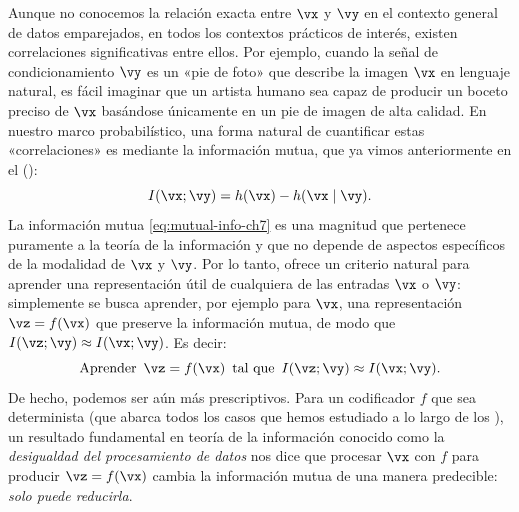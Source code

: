 \documentclass[../../book-main_es.tex]{subfiles}
\begin{document}
Aunque no conocemos la relación exacta entre $\vx$ y $\vy$ en el
contexto general de datos emparejados, en todos los contextos prácticos de interés,
existen correlaciones significativas entre ellos. Por ejemplo, cuando la señal de condicionamiento $\vy$ es
un «pie de foto» que describe la imagen $\vx$ en lenguaje natural, es fácil
imaginar que un artista humano sea capaz de producir un boceto preciso de $\vx$ basándose
únicamente en un pie de imagen de alta calidad.
En nuestro marco probabilístico, una forma natural de cuantificar estas
«correlaciones» es mediante la información mutua, que ya vimos anteriormente
en el  ():
\begin{equation}\label{eq:mutual-info-ch7}
    I(\vx; \vy) = h(\vx) - h(\vx \mid \vy).
\end{equation}
La información mutua \eqref{eq:mutual-info-ch7} es una magnitud que pertenece puramente
a la teoría de la información y que no depende de aspectos específicos de la modalidad
de $\vx$ y $\vy$.
Por lo tanto, ofrece un criterio natural para aprender una representación útil de
cualquiera de las entradas $\vx$ o $\vy$: simplemente se busca aprender, por ejemplo para $\vx$,
una representación $\vz = f(\vx)$ que preserve la información mutua, de modo que
$I(\vz; \vy) \approx I(\vx; \vy)$.
Es decir:
\begin{equation}\label{eq:infomax-x-abstract}
    \text{Aprender} \enspace \vz = f(\vx) \enspace \text{tal que} \enspace I(\vz;
    \vy) \approx I(\vx; \vy).
\end{equation}
De hecho, podemos ser aún más prescriptivos. Para un codificador $f$ que sea
determinista (que abarca todos los casos que hemos estudiado a lo largo de los
), un resultado fundamental
en teoría de la información conocido como la \textit{desigualdad del procesamiento de datos} nos dice
que procesar $\vx$ con $f$ para producir $\vz = f(\vx)$ cambia la información mutua
de una manera predecible: \textit{solo puede reducirla}.
\end{document}
